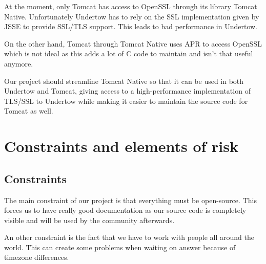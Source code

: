\documentclass[11pt,a4paper,bibliography=totocnumbered]{scrartcl}
\begin{document}
At the moment, only Tomcat has access to OpenSSL through its library Tomcat Native. Unfortunately Undertow has to rely on the SSL implementation given by JSSE to provide SSL/TLS support. This leads to bad performance in Undertow.

On the other hand, Tomcat through Tomcat Native uses APR to access OpenSSL which is not ideal as this adds a lot of C code to maintain and isn't that useful anymore.

Our project should streamline Tomcat Native so that it can be used in both Undertow and Tomcat, giving access to a high-performance implementation of TLS/SSL to Undertow while making it easier to maintain the source code for  Tomcat as well.



\section{Constraints and elements of risk}

\subsection{Constraints}
\label{subsec:constraints}

The main constraint of our project is that everything must be open-source. This forces us to have really good documentation as our source code is completely visible and will be used by the community afterwards.

An other constraint is the fact that we have to work with people all around the world. This can create some problems when waiting on answer because of timezone differences.
\end{document}
